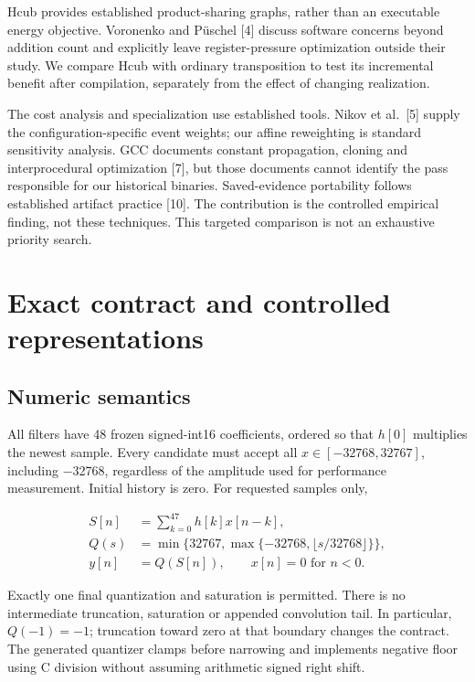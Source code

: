 \documentclass[conference]{IEEEtran}
\begin{document}
Hcub provides established product-sharing graphs, rather than an
executable energy objective. Voronenko and Püschel {[}4{]} discuss
software concerns beyond addition count and explicitly leave
register-pressure optimization outside their study. We compare Hcub with
ordinary transposition to test its incremental benefit after
compilation, separately from the effect of changing realization.

The cost analysis and specialization use established tools. Nikov et
al.~{[}5{]} supply the configuration-specific event weights; our affine
reweighting is standard sensitivity analysis. GCC documents constant
propagation, cloning and interprocedural optimization {[}7{]}, but those
documents cannot identify the pass responsible for our historical
binaries. Saved-evidence portability follows established artifact
practice {[}10{]}. The contribution is the controlled empirical finding,
not these techniques. This targeted comparison is not an exhaustive
priority search.

\section{Exact contract and controlled representations}\label{exact-contract-and-controlled-representations}

\subsection{Numeric semantics}\label{numeric-semantics}

All filters have 48 frozen signed-int16 coefficients, ordered so that
\(h[0]\) multiplies the newest sample. Every candidate must accept all
\(x\in[-32768,32767]\), including −32768, regardless of the amplitude
used for performance measurement. Initial history is zero. For requested
samples only,

\[
\begin{aligned}
S[n]&=\sum_{k=0}^{47}h[k]x[n-k],\\
Q(s)&=\min\{32767,\max\{-32768,\lfloor s/32768\rfloor\}\},\\
y[n]&=Q(S[n]),\qquad x[n]=0\text{ for }n<0.
\end{aligned}
\]

Exactly one final quantization and saturation is permitted. There is no
intermediate truncation, saturation or appended convolution tail. In
particular, \(Q(-1)=-1\); truncation toward zero at that boundary
changes the contract. The generated quantizer clamps before narrowing
and implements negative floor using C division without assuming
arithmetic signed right shift.
\end{document}
